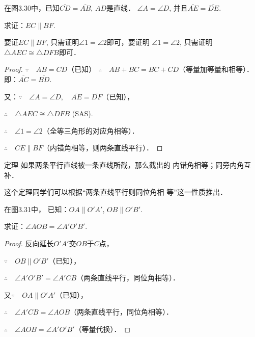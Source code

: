 \begin{example}
    在图3.30中，已知$\overline{CD}=\overline{AB}$, $AD$是直线．
$\angle A=\angle D$, 并且$\overline{AE}=\overline{DE}$.

求证：$EC\parallel BF$.

\end{example}

\begin{analyze}
要证$EC\parallel BF$, 只需证明$\angle 1=\angle 2$即可，要证明
$\angle 1=\angle 2$, 只需证明$\triangle AEC\cong \triangle DFB$即可．
\end{analyze}

\begin{proof}
    $\because\quad \overline{AB}=\overline{CD}$（已知）
    $\therefore\quad \overline{AB}+\overline{BC}=\overline{BC}+\overline{CD}$（等量加等量和相等）．即：$\overline{AC}=\overline{BD}$.

又：$\because\quad \angle A=\angle D,\quad \overline{AE}=\overline{DF}$（已知），

$\therefore\quad \triangle AEC\cong \triangle DFB$ (SAS).

$\therefore\quad \angle 1=\angle 2$（全等三角形的对应角相等）．

$\therefore\quad CE\parallel BF$（内错角相等，则两条直线平行）．
\end{proof}

\begin{blk}
  {定理} 如果两条平行直线被一条直线所截，那么截出的
内错角相等；同旁内角互补．  
\end{blk}

这个定理同学们可以根据“两条直线平行则同位角相
等”这一性质推出．

\begin{example}
     在图3.31中，
已知：$OA\parallel O'A'$, $OB\parallel O'B'$.

求证：$\angle AOB=\angle A'O'B'$.   
\end{example}

\begin{proof}
    反向延长$O'A'$交$OB$于$C$点，

$\because\quad OB\parallel O'B'$（已知），

$\therefore\quad\angle A'O'B'=\angle A'CB$（两条直线平行，同位角相等）．

又$\because\quad OA\parallel O'A'$（已知），

$\therefore\quad \angle A'CB=\angle AOB$（两条直线平行，同位角相等）．

$\therefore\quad \angle AOB=\angle A'O'B'$（等量代换）．
\end{proof}

